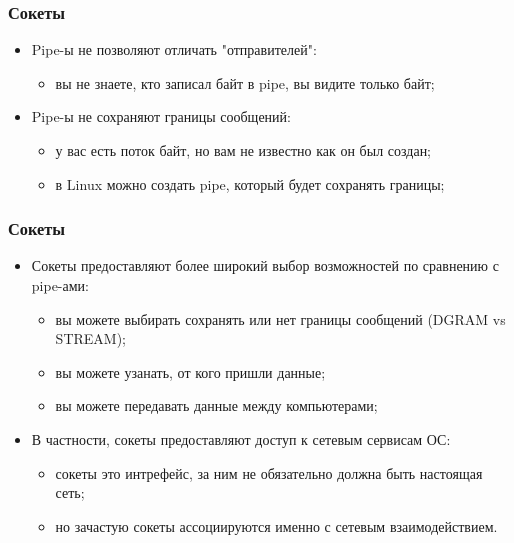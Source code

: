 \begin{frame}
\frametitle{Сокеты}

\begin{itemize}
  \item<1-> Pipe-ы не позволяют отличать "отправителей":
    \begin{itemize}
      \item вы не знаете, кто записал байт в pipe, вы видите только байт;
    \end{itemize}
  \item<2-> Pipe-ы не сохраняют границы сообщений:
    \begin{itemize}
      \item у вас есть поток байт, но вам не известно как он был создан;
      \item в Linux можно создать pipe, который будет сохранять границы;
    \end{itemize}
\end{itemize}
\end{frame}

\begin{frame}
\frametitle{Сокеты}

\begin{itemize}
  \item<1-> Сокеты предоставляют более широкий выбор возможностей по сравнению с pipe-ами:
    \begin{itemize}
      \item вы можете выбирать сохранять или нет границы сообщений (DGRAM vs STREAM);
      \item вы можете узанать, от кого пришли данные;
      \item вы можете передавать данные между компьютерами;
    \end{itemize}
  \item<2-> В частности, сокеты предоставляют доступ к сетевым сервисам ОС:
    \begin{itemize}
      \item сокеты это интрефейс, за ним не обязательно должна быть настоящая сеть;
      \item но зачастую сокеты ассоциируются именно с сетевым взаимодействием.
    \end{itemize}
\end{itemize}
\end{frame}

